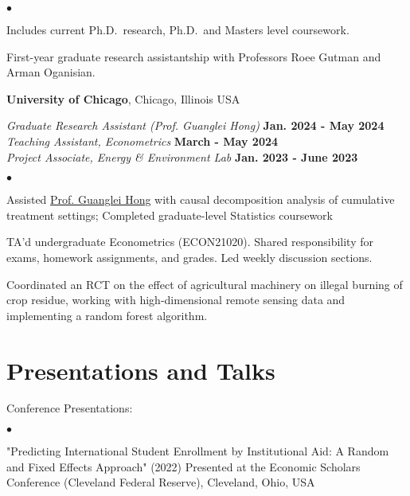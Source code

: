 \documentclass[margin,line]{res}
\newenvironment{list2}{
  \begin{list}{$\bullet$}{%
      \setlength{\itemsep}{0in}
      \setlength{\parsep}{0in} \setlength{\parskip}{0in}
      \setlength{\topsep}{0in} \setlength{\partopsep}{0in} 
      \setlength{\leftmargin}{0.2in}}}{\end{list}}
\begin{document}
\begin{resume}
\begin{list2}
\item Includes current Ph.D.~research, Ph.D.~and Masters level coursework. 
\item First-year graduate research assistantship with Professors Roee Gutman and Arman Oganisian.
\end{list2}

{\bf University of Chicago}, Chicago, Illinois USA

\vspace{-.3cm}
{\em Graduate Research Assistant (Prof. Guanglei Hong)} \hfill {\bf Jan. 2024 - May 2024}\\
{\em Teaching Assistant, Econometrics} \hfill {\bf March - May 2024}\\
{\em Project Associate, Energy \& Environment Lab} \hfill {\bf Jan. 2023 - June 2023}\\

\begin{list2}
\item Assisted \href{https://voices.uchicago.edu/ghong/}{Prof. Guanglei Hong} with causal decomposition analysis of cumulative treatment settings; Completed graduate-level Statistics coursework
\item TA'd undergraduate Econometrics (ECON21020). Shared responsibility for exams, homework assignments, and grades. Led weekly discussion sections.  
\item Coordinated an RCT on the effect of agricultural machinery on illegal burning of crop residue, working with high-dimensional remote sensing data and implementing a random forest algorithm.  
\end{list2}



\section{\sc Presentations and Talks}
Conference Presentations:
\begin{list2}
\item "Predicting International Student Enrollment by Institutional Aid: A Random and Fixed Effects Approach" (2022) Presented at the Economic Scholars Conference (Cleveland Federal Reserve), Cleveland, Ohio, USA
\end{list2}


\end{resume}
\end{document}
